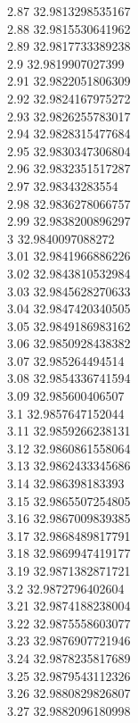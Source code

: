 {2.87	32.9813298535167\\
2.88	32.9815530641962\\
2.89	32.9817733389238\\
2.9	32.9819907027399\\
2.91	32.9822051806309\\
2.92	32.9824167975272\\
2.93	32.9826255783017\\
2.94	32.9828315477684\\
2.95	32.9830347306804\\
2.96	32.9832351517287\\
2.97	32.98343283554\\
2.98	32.9836278066757\\
2.99	32.9838200896297\\
3	32.9840097088272\\
3.01	32.9841966886226\\
3.02	32.9843810532984\\
3.03	32.9845628270633\\
3.04	32.9847420340505\\
3.05	32.9849186983162\\
3.06	32.9850928438382\\
3.07	32.985264494514\\
3.08	32.9854336741594\\
3.09	32.985600406507\\
3.1	32.9857647152044\\
3.11	32.9859266238131\\
3.12	32.9860861558064\\
3.13	32.9862433345686\\
3.14	32.986398183393\\
3.15	32.9865507254805\\
3.16	32.9867009839385\\
3.17	32.9868489817791\\
3.18	32.9869947419177\\
3.19	32.9871382871721\\
3.2	32.9872796402604\\
3.21	32.9874188238004\\
3.22	32.9875558603077\\
3.23	32.9876907721946\\
3.24	32.9878235817689\\
3.25	32.9879543112326\\
3.26	32.9880829826807\\
3.27	32.9882096180998\\
}
